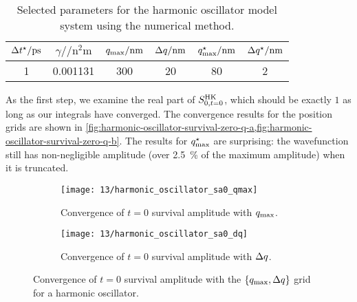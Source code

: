 \begin{table}
	\begin{center}
	\begin{tabular}{ c S[table-format=1.6] c c c c }
		\toprule
		{$\dt\alt / \si{\pico\second}$} & {$\gamma / \si{\per\square\nano\meter}$} & {$q_\mathrm{max} / \si{\nano\meter}$} & {$\Delta q / \si{\nano\meter}$} & {$q_\mathrm{max}^\star / \si{\nano\meter}$} & {$\Delta q^\star / \si{\nano\meter}$} \\
		 & 0.001131 & 300 & 20 & 80 & 2 \\
		\bottomrule
	\end{tabular}
	\end{center}
	\caption[
		Selected parameters for harmonic oscillator (numerical)
	]{
		Selected parameters for the harmonic oscillator model system using the numerical method.
	}
	\label{tab:model-sa0-harmonic-oscillator}
\end{table}

As the first step, we examine the real part of $S_{0,t=0}^\mathrm{HK}$, which should be exactly $1$ as long as our integrals have converged.
The convergence results for the position grids are shown in \cref{fig:harmonic-oscillator-survival-zero-q-a,fig:harmonic-oscillator-survival-zero-q-b}.
The results for $q_\mathrm{max}^\star$ are surprising: the wavefunction still has non-negligible amplitude (over \SI{2.5}{\percent} of the maximum amplitude) when it is truncated.

\begin{figure}
	\setlength{\figspacing}{5 mm}
	\centering
	\begin{subfigure}[b]{\textwidth}
		\texttt{[image: 13/harmonic\_oscillator\_sa0\_qmax]}
		\caption{
			Convergence of $t = 0$ survival amplitude with $q_\mathrm{max}$.
		}
		\vspace{\figspacing}
	\end{subfigure}
	\begin{subfigure}[b]{\textwidth}
		\texttt{[image: 13/harmonic\_oscillator\_sa0\_dq]}
		\caption{
			Convergence of $t = 0$ survival amplitude with $\Delta q$.
		}
	\end{subfigure}
	\caption[
		Convergence of harmonic oscillator survival amplitude with position grids
	]{
		Convergence of $t = 0$ survival amplitude with the $\{ q_\mathrm{max}, \Delta q \}$ grid for a harmonic oscillator.
		\explainplotsazero{}
	}
	\label{fig:harmonic-oscillator-survival-zero-q-a}
\end{figure}

